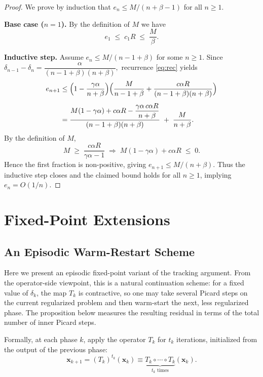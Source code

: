 \documentclass[letterpaper,11pt]{article}
\newcommand{\vect}[1]{\mathbf{#1}}
\begin{document}
\begin{proof}
We prove by induction that \(e_n\le M/(n+\beta-1)\) for all \(n\ge 1\).

\smallskip
\noindent\textbf{Base case (\(n=1\)).}
By the definition of \(M\) we have
\[
   e_1 \;\le\; c_1R \;\le\; \frac{M}{\beta}.
\]

\smallskip
\noindent\textbf{Inductive step.}
Assume \(e_{n}\le M/(n-1+\beta)\) for some \(n\ge 1\).
Since
\(
   \delta_{n-1}-\delta_n
   =\dfrac{\alpha}{(n-1+\beta)(n+\beta)},
\)
recurrence \eqref{eq:rec} yields
\[
\begin{aligned}
   e_{n+1}
   &\le
   \Bigl(1-\frac{\gamma\alpha}{n+\beta}\Bigr)
   \Bigl(
      \frac{M}{n-1+\beta}
      +\frac{c\alpha R}{(n-1+\beta)(n+\beta)}
   \Bigr) \\[4pt]
   &=
   \frac{M(1-\gamma\alpha)+c\alpha R
         -\dfrac{\gamma\alpha\,c\alpha R}{n+\beta}}
        {(n-1+\beta)(n+\beta)}
   \;+\;
   \frac{M}{n+\beta}.
\end{aligned}
\]
By the definition of \(M\),
\[
   M \;\ge\; \frac{c\alpha R}{\gamma\alpha-1}
   \;\Longrightarrow\;
   M(1-\gamma\alpha)+c\alpha R \;\le\; 0.
\]
Hence the first fraction is non-positive, giving
\(
   e_{n+1}\le M/(n+\beta).
\)
Thus the inductive step closes and the claimed bound holds for all \(n\ge 1\), implying
\(e_n=O(1/n)\).
\end{proof}

\section{Fixed-Point Extensions}\label{app:fixed-point-extensions}

\subsection{An Episodic Warm-Restart Scheme}
Here we present an episodic fixed-point variant of the tracking
argument. From the operator-side viewpoint, this is a natural continuation
scheme: for a fixed value of \(\delta_k\), the map \(T_k\) is contractive, so
one may take several Picard steps on the current regularized problem and then
warm-start the next, less regularized phase. The proposition below measures the
resulting residual in terms of the total number of inner Picard steps.

Formally, at each phase \(k\), apply the operator \(T_k\) for \(t_k\) iterations, initialized from the output of the previous phase:
\begin{equation}
    \vect{x}_{k+1} = (T_k)^{t_k}(\vect{x}_k)
    \equiv
    \underbrace{T_k \circ \cdots \circ T_k}_{t_k \text{ times}}(\vect{x}_k).
\end{equation}
\end{document}
